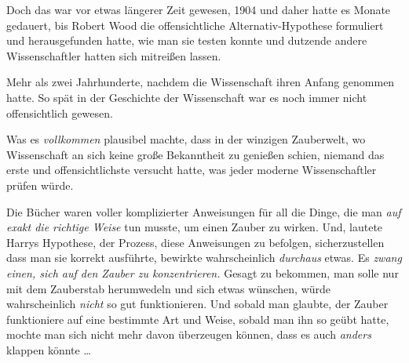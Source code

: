 Doch das war vor etwas längerer Zeit gewesen, 1904 und daher hatte es Monate gedauert, bis Robert Wood die offensichtliche Alternativ-Hypothese formuliert und herausgefunden hatte, wie man sie testen konnte und dutzende andere Wissenschaftler hatten sich mitreißen lassen.

Mehr als zwei Jahrhunderte, nachdem die Wissenschaft ihren Anfang genommen hatte. So spät in der Geschichte der Wissenschaft war es noch immer nicht offensichtlich gewesen.

Was es \emph{vollkommen} plausibel machte, dass in der winzigen Zauberwelt, wo Wissenschaft an sich keine große Bekanntheit zu genießen schien, niemand das erste und offensichtlichste versucht hatte, was jeder moderne Wissenschaftler prüfen würde.

Die Bücher waren voller komplizierter Anweisungen für all die Dinge, die man \emph{auf exakt die richtige Weise} tun musste, um einen Zauber zu wirken. Und, lautete Harrys Hypothese, der Prozess, diese Anweisungen zu befolgen, sicherzustellen dass man sie korrekt ausführte, bewirkte wahrscheinlich \emph{durchaus} etwas. Es \emph{zwang einen, sich auf den Zauber zu konzentrieren.} Gesagt zu bekommen, man solle nur mit dem Zauberstab herumwedeln und sich etwas wünschen, würde wahrscheinlich \emph{nicht} so gut funktionieren. Und sobald man glaubte, der Zauber funktioniere auf eine bestimmte Art und Weise, sobald man ihn so geübt hatte, mochte man sich nicht mehr davon überzeugen können, dass es auch \emph{anders} klappen könnte …

